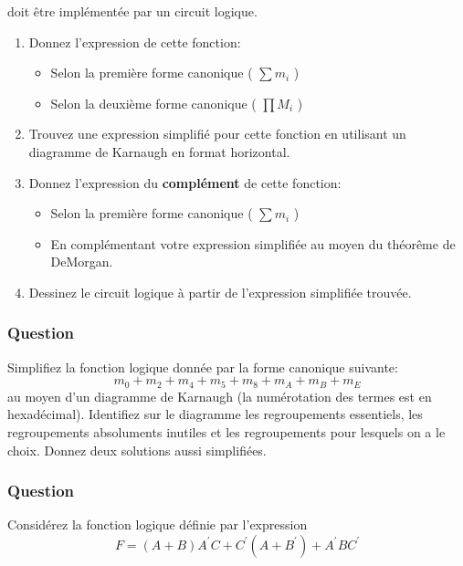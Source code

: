 \documentclass[11pt]{article}
\begin{document}
doit être implémentée par un circuit logique.

\begin{enumerate}
\item Donnez l'expression de cette fonction:

\begin{itemize}
\item Selon la première forme canonique ( \(\sum m_i\) )

\item Selon la deuxième forme canonique ( \(\prod M_i\) )
\end{itemize}

\item Trouvez une expression simplifié pour cette fonction en utilisant
un diagramme de Karnaugh en format horizontal.

\item Donnez l'expression du \textbf{complément} de cette fonction:

\begin{itemize}
\item Selon la première forme canonique ( \(\sum m_i\) )

\item En complémentant votre expression simplifiée au moyen du
théorême de DeMorgan.
\end{itemize}

\item Dessinez le circuit logique à partir de l'expression simplifiée
trouvée.
\end{enumerate}

\subsubsection*{Question}
\label{sec:org70927f7}
Simplifiez la fonction logique donnée par la forme canonique
  suivante:
  $$
    m_0 + m_2 + m_4 + m_5 + m_8 + m_A + m_B + m_E
    $$
  au
  moyen d'un diagramme de Karnaugh (la numérotation des termes est en
  hexadécimal). Identifiez sur le diagramme les regroupements
  essentiels, les regroupements absoluments inutiles et les
  regroupements pour lesquels on a le choix. Donnez deux solutions
  aussi simplifiées.

\subsubsection*{Question}
\label{sec:org7db2008}
Considérez la fonction logique définie par l'expression
  $$
    F =
      (A + B) A^{\prime} C + C^{\prime}(A+B^{\prime}) + A^{\prime}B
      C^{\prime}
    $$
\end{document}
